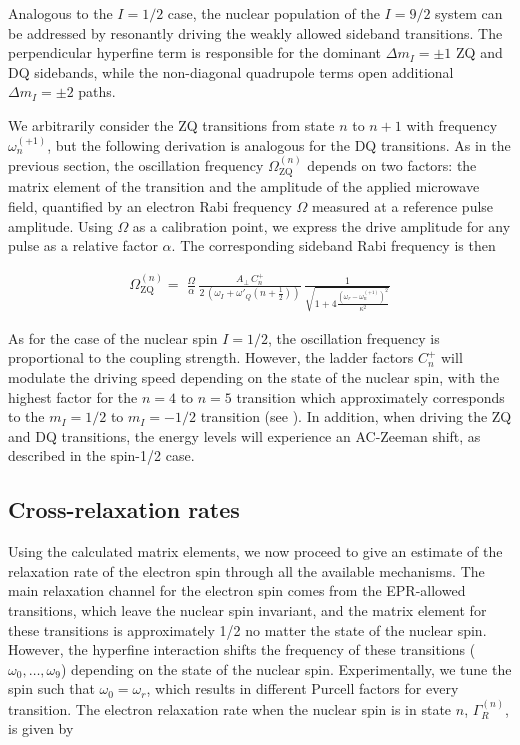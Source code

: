 Analogous to the $I=1/2$ case, the nuclear population of the $I=9/2$ system can be addressed by resonantly driving the weakly allowed sideband transitions. The perpendicular hyperfine term is responsible for the dominant $\Delta m_I = \pm 1$ ZQ and DQ sidebands, while the non-diagonal quadrupole terms open additional $\Delta m_I = \pm 2$ paths. 

We arbitrarily consider the ZQ transitions from state $n$ to $n+1$ with frequency $\omega_n^{(+1)}$, but the following derivation is analogous for the DQ transitions. As in the previous section, the oscillation frequency $\Omega^{(n)}_{\text{ZQ}}$ depends on two factors: the matrix element of the transition and the amplitude of the applied microwave field, quantified by an electron Rabi frequency $\Omega$ measured at a reference pulse amplitude. Using $\Omega$ as a calibration point, we express the drive amplitude for any pulse as a relative factor $\alpha$. The corresponding sideband Rabi frequency is then 

\begin{equation}
\begin{split}
    \Omega^{(n)}_{\text{ZQ}} =\; \frac{\Omega}{\alpha} \, \frac{A_\perp\, C^+_{n}}{2\,\left(\omega_I+\omega'_Q\!\left(n+\tfrac12\right)\right)}\, \frac{1}{\sqrt{1 + 4\frac{(\omega_r-\omega_n^{(+1)})^2}{\kappa^2}} } 
\end{split}
\label{eq:zero_double_quantum_ninehalf_rabi}
\end{equation}

As for the case of the nuclear spin $I=1/2$, the oscillation frequency is proportional to the coupling strength. However, the ladder factors $C^+_{n}$ will modulate the driving speed depending on the state of the nuclear spin, with the highest factor for the $n=4$ to $n=5$ transition which approximately corresponds to the $m_I=1/2$ to $m_I=-1/2$ transition (see ). In addition, when driving the ZQ and DQ transitions, the energy levels will experience an AC-Zeeman shift, as described in the spin-1/2 case.

\subsection{Cross-relaxation rates}

Using the calculated matrix elements, we now proceed to give an estimate of the relaxation rate of the electron spin through all the available mechanisms. The main relaxation channel for the electron spin comes from the EPR-allowed transitions, which leave the nuclear spin invariant, and the matrix element for these transitions is approximately 1/2 no matter the state of the nuclear spin. However, the hyperfine interaction shifts the frequency of these transitions ($\omega_0, \dots,\omega_9$) depending on the state of the nuclear spin. Experimentally, we tune the spin such that $\omega_0=\omega_r$, which results in different Purcell factors for every transition. The electron relaxation rate when the nuclear spin is in state $n$, $\Gamma_R^{(n)}$, is given by

